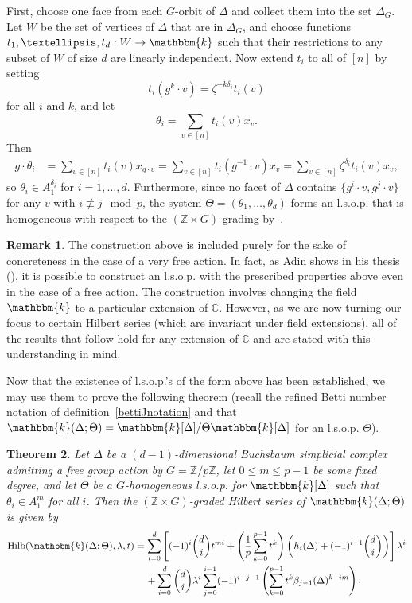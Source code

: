 \documentclass[10pt]{amsart}
\newtheorem{theo}{Theorem}[section]
\theoremstyle{definition}
\newtheorem{rema}[theo]{Remark}
\DeclareMathOperator{\Hilb}{Hilb}
\newcommand{\field}{\mathbbm{k}}
\newcommand{\CC}{{\mathbb C}}
\newcommand{\ZZ}{{\mathbb Z}}
\newcommand*{\MK}{\mkern 2mu}
\begin{document}
First, choose one face from each $G$-orbit of $\Delta$ and collect them into the set $\Delta_G$. Let $W$ be the set of vertices of $\Delta$ that are in $\Delta_G$, and choose functions $t_1, \ldots, t_d:W\to\field$ such that their restrictions to any subset of $W$ of size $d$ are linearly independent. Now extend $t_i$ to all of $[n]$ by setting
\[
t_i(g^k\cdot v)=\zeta^{-k\delta_i}t_i(v)
\]
for all $i$ and $k$, and let
\[
\theta_i=\sum_{v\in [n]}t_i(v)x_v.
\]
Then
\begin{align*}
g\cdot\theta_i &= \sum_{v\in [n]}t_i(v)x_{g\cdot v}=\sum_{v\in [n]}t_i(g^{-1}\cdot v)x_v=\sum_{v\in [n]}\zeta^{\delta_i}t_i(v)x_v,
\end{align*}
so $\theta_i\in A_1^{\delta_i}$ for $i=1, \ldots, d$. Furthermore, since no facet of $\Delta$ contains $\{g^i\cdot v, g^j\cdot v\}$ for any $v$ with $i\not\equiv j \mod p$, the system $\Theta=(\theta_1, \ldots, \theta_d)$ forms an l.s.o.p. that is homogeneous with respect to the $(\ZZ\times G)$-grading by~\cite[Lemma~III.2.4$\MK$(a)]{St-96}.

\begin{rema}\label{freeactionlsop}
The construction above is included purely for the sake of concreteness in the case of a very free action. In fact, as Adin shows in his thesis (\cite{AdinThesis}), it is possible to construct an l.s.o.p. with the prescribed properties above even in the case of a free action. The construction involves changing the field $\field$ to a particular extension of $\CC$. However, as we are now turning our focus to certain Hilbert series (which are invariant under field extensions), all of the results that follow hold for any extension of $\CC$ and are stated with this understanding in mind.
\end{rema}


Now that the existence of l.s.o.p.'s of the form above has been established, we may use them to prove the following theorem (recall the refined Betti number notation of definition~\eqref{bettiJnotation} and that $\field(\Delta; \Theta)=\field[\Delta]/\Theta\field[\Delta]$ for an l.s.o.p. $\Theta$).

\begin{theo}\label{SchenzelAnalog}
Let $\Delta$ be a $(d-1)$-dimensional Buchsbaum simplicial complex admitting a free group action by $G=\ZZ/p\ZZ$, let $0\le m\le p-1$ be some fixed degree, and let $\Theta$ be a $G$-homogeneous l.s.o.p. for $\field[\Delta]$ such that $\theta_i\in A_1^m$ for all $i$. Then the $(\ZZ\times G)$-graded Hilbert series of $\field(\Delta;\Theta)$ is given by
\begin{align*}
\Hilb(\field(\Delta; \Theta), \lambda, t)&=\sum_{i=0}^d\left[(-1)^i\binom{d}{i}t^{mi}+\left(\frac{1}{p}\sum_{k=0}^{p-1}t^k\right)\left(h_i(\Delta)+(-1)^{i+1}\binom{d}{i}\right)\right]\lambda^i\\
&\quad\,+\sum_{i=0}^d\binom{d}{i}\lambda^i\sum_{j=0}^{i-1}(-1)^{i-j-1}\left(\sum_{k=0}^{p-1}t^k\beta_{j-1}(\Delta)^{k-im} \right).
\end{align*}
\end{theo}
\end{document}

